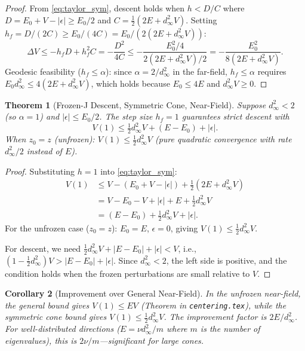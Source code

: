 \documentclass[11pt]{article}
\newtheorem{theorem}{Theorem}
\newtheorem{corollary}[theorem]{Corollary}
\begin{document}
\begin{proof}
From \eqref{eq:taylor_sym}, descent holds when
$h < D/C$ where $D = E_0 + V - |\epsilon| \ge E_0/2$ and
$C = \frac{1}{2}(2E + d_\infty^2 V)$.  Setting $h_f = D/(2C) \ge
E_0/(4C) = E_0/(2(2E + d_\infty^2 V))$:
\begin{equation}
    \Delta V \le -h_f D + h_f^2 C = -\frac{D^2}{4C}
    \le -\frac{E_0^2/4}{2(2E + d_\infty^2 V)/2}
    = -\frac{E_0^2}{8(2E + d_\infty^2 V)}.
\end{equation}
Geodesic feasibility ($h_f \le \alpha$): since $\alpha = 2/d_\infty^2$
in the far-field, $h_f \le \alpha$ requires
$E_0 d_\infty^2 \le 4(2E + d_\infty^2 V)$, which holds because
$E_0 \le 4E$ and $d_\infty^2 V \ge 0$.
\end{proof}

\begin{theorem}[Frozen-J Descent, Symmetric Cone, Near-Field]
\label{thm:sym_nearfield}
Suppose $d_\infty^2 < 2$ (so $\alpha = 1$) and $|\epsilon| \le E_0/2$.
The step size $h_f = 1$ guarantees strict descent with
\begin{equation}
    V(1) \le \tfrac{1}{2}d_\infty^2 V + (E - E_0) + |\epsilon|.
\end{equation}
When $z_0 = z$ (unfrozen): $V(1) \le \frac{1}{2}d_\infty^2 V$
(pure quadratic convergence with rate $d_\infty^2/2$ instead of $E$).
\end{theorem}

\begin{proof}
Substituting $h = 1$ into \eqref{eq:taylor_sym}:
\begin{align}
    V(1) &\le V - (E_0 + V - |\epsilon|) + \tfrac{1}{2}(2E + d_\infty^2 V) \nonumber \\
         &= V - E_0 - V + |\epsilon| + E + \tfrac{1}{2}d_\infty^2 V \nonumber \\
         &= (E - E_0) + \tfrac{1}{2}d_\infty^2 V + |\epsilon|.
\end{align}
For the unfrozen case ($z_0 = z$): $E_0 = E$, $\epsilon = 0$, giving
$V(1) \le \frac{1}{2}d_\infty^2 V$.

For descent, we need $\frac{1}{2}d_\infty^2 V + |E-E_0| + |\epsilon| < V$,
i.e., $(1 - \frac{1}{2}d_\infty^2)V > |E-E_0| + |\epsilon|$.  Since
$d_\infty^2 < 2$, the left side is positive, and the condition holds
when the frozen perturbations are small relative to $V$.
\end{proof}

\begin{corollary}[Improvement over General Near-Field]
\label{cor:improvement}
In the unfrozen near-field, the general bound gives $V(1) \le EV$
(Theorem in \texttt{centering.tex}), while the symmetric cone bound
gives $V(1) \le \frac{1}{2}d_\infty^2 V$.  The improvement factor is
$2E/d_\infty^2$.  For well-distributed directions ($E = \nu d_\infty^2/m$
where $m$ is the number of eigenvalues), this is $2\nu/m$---significant
for large cones.
\end{corollary}
\end{document}
